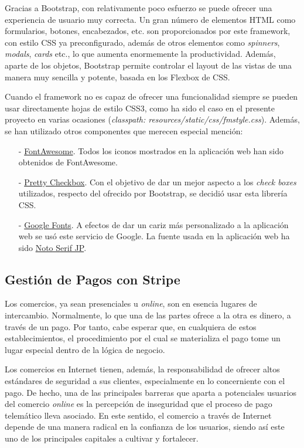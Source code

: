 \documentclass[a4paper]{article}
\begin{document}
    Gracias a Bootstrap, con relativamente poco esfuerzo se puede ofrecer una experiencia de usuario muy correcta. Un gran número de elementos HTML como formularios, botones, encabezados, etc. son proporcionados por este framework, con estilo CSS ya preconfigurado, además de otros elementos como \emph{spinners}, \emph{modals}, \emph{cards} etc., lo que aumenta enormemente la productividad.  Además, aparte de los objetos, Bootstrap permite controlar el layout de las vistas de una manera muy sencilla y potente, basada en los Flexbox de CSS.
    
    Cuando el framework no es capaz de ofrecer una funcionalidad siempre se pueden usar directamente hojas de estilo CSS3, como ha sido el caso en el presente proyecto en varias ocasiones (\emph{classpath: resources/static/css/fmstyle.css}). Además, se han utilizado otros componentes que merecen especial mención:
    
    \begin{itemize}
    	\item[-] \href{https://fontawesome.com/}{FontAwesome}. Todos los iconos mostrados en la aplicación web han sido obtenidos de FontAwesome.
    	\item[-] \href{https://lokesh-coder.github.io/pretty-checkbox/}{Pretty Checkbox}. Con el objetivo de dar un mejor aspecto a los \emph{check boxes} utilizados, respecto del ofrecido por Bootstrap, se decidió usar esta librería CSS.
    	\item[-] \href{https://fonts.google.com/}{Google Fonts}. A efectos de dar un cariz más personalizado a la aplicación web se usó este servicio de Google. La fuente usada en la aplicación web ha sido \href{https://fonts.google.com/specimen/Noto+Serif+JP}{Noto Serif JP}.
    \end{itemize}
    
    \subsection[Pagos con Stripe]{Gestión de Pagos con Stripe} \label{sec:stripe}
    Los comercios, ya sean presenciales u \emph{online}, son en esencia lugares de intercambio. Normalmente, lo que una de las partes ofrece a la otra es dinero, a través de un pago. Por tanto, cabe esperar que, en cualquiera de estos establecimientos, el procedimiento por el cual se materializa el pago tome un lugar especial dentro de la lógica de negocio.
    
    Los comercios en Internet tienen, además, la responsabilidad de ofrecer altos estándares de seguridad a sus clientes, especialmente en lo concerniente con el pago. De hecho, una de las principales barreras que aparta a potenciales usuarios del comercio \emph{online} es la percepción de inseguridad que el proceso de pago telemático lleva asociado. En este sentido, el comercio a través de Internet depende de una manera radical en la confianza de los usuarios, siendo así este uno de los principales capitales a cultivar y fortalecer.
    
\end{document}
